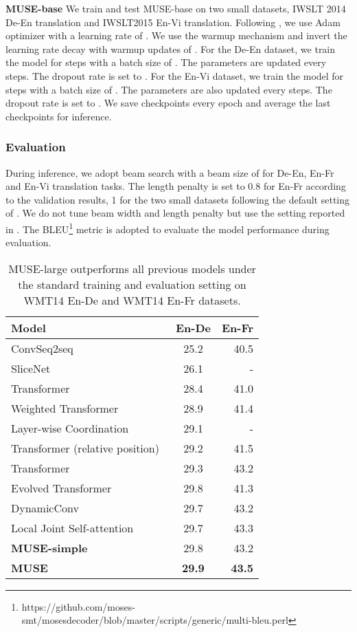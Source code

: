 \documentclass{article} \usepackage{iclr2020_conference,times}
\begin{document}
\textbf{MUSE-base}
We train and test MUSE-base on two small datasets, IWSLT 2014 De-En translation and  IWSLT2015 En-Vi translation.  Following \citet{vaswani2017attention}, we use Adam optimizer with a learning rate of . We use the warmup mechanism and invert the learning rate decay with warmup updates of . 
For the De-En dataset, we train the model for  steps with a batch size of . The parameters are updated every  steps. The dropout rate is set to . For the En-Vi dataset, we train the model for  steps with a batch size of . The parameters are  also updated every  steps. The dropout rate is set to .
We  save checkpoints every epoch and average the last  checkpoints for inference.

\subsubsection{Evaluation}
During inference, we adopt beam search with a beam size of  for De-En, En-Fr and  En-Vi translation tasks. The length penalty is set to 0.8 for En-Fr according to  the validation results, 1 for the two small datasets following the default setting of \cite{ott2019fairseq}. We do not tune beam width and length penalty but use the setting reported in \citet{vaswani2017attention}.
The BLEU\footnote{https://github.com/moses-smt/mosesdecoder/blob/master/scripts/generic/multi-bleu.perl} metric is adopted to evaluate the model performance during evaluation. 

\begin{table*}
\centering
\begin{tabular}{lcr}
\toprule
Model   & En-De & En-Fr \\
\midrule
ConvSeq2seq~\citep{gehring2017convolutional}  & 25.2  & 40.5 \\
SliceNet~\citep{kaiser2017depthwise} & 26.1 &- \\
Transformer~\citep{vaswani2017attention}  &28.4  & 41.0 \\
Weighted Transformer~\citep{ahmed2017weighted}  & 28.9 & 41.4 \\
Layer-wise Coordination~\citep{NIPS2018_8019}  & 29.1 & - \\
Transformer (relative position)~\citep{Shaw_2018}   & 29.2 & 41.5 \\
Transformer~\citep{ott2018scaling} & 29.3 & 43.2 \\
Evolved Transformer~\citep{so2019evolved} &  29.8 & 41.3 \\
DynamicConv~\citep{wu2019pay}  & 29.7 & 43.2 \\

Local Joint Self-attention~\citep{fonollosa2019joint} &29.7  & 43.3 \\
\midrule
\textbf{MUSE-simple} & 29.8 & 43.2 \\
\textbf{MUSE}  & \textbf{29.9} & \textbf{43.5} \\
\bottomrule
\end{tabular}
\caption{MUSE-large outperforms all previous models under the standard training and evaluation setting on WMT14 En-De and WMT14 En-Fr datasets.}
\label{tab:enfr}
\vspace{-0.2cm}
\end{table*}
\end{document}

